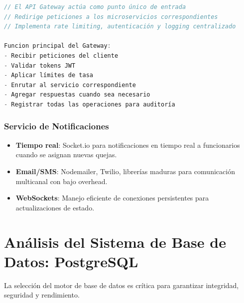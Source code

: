 \begin{lstlisting}[language=Java, caption=Estructura conceptual de API Gateway]
// El API Gateway actúa como punto único de entrada
// Redirige peticiones a los microservicios correspondientes
// Implementa rate limiting, autenticación y logging centralizado

Funcion principal del Gateway:
- Recibir peticiones del cliente
- Validar tokens JWT
- Aplicar límites de tasa
- Enrutar al servicio correspondiente
- Agregar respuestas cuando sea necesario
- Registrar todas las operaciones para auditoría
\end{lstlisting}

\subsubsection{Servicio de Notificaciones}

\begin{itemize}
    \item \textbf{Tiempo real}: Socket.io para notificaciones en tiempo real a funcionarios cuando se asignan nuevas quejas.
    
    \item \textbf{Email/SMS}: Nodemailer, Twilio, librerías maduras para comunicación multicanal con bajo overhead.
    
    \item \textbf{WebSockets}: Manejo eficiente de conexiones persistentes para actualizaciones de estado.
\end{itemize}

\section{Análisis del Sistema de Base de Datos: PostgreSQL}

La selección del motor de base de datos es crítica para garantizar integridad, seguridad y rendimiento.

